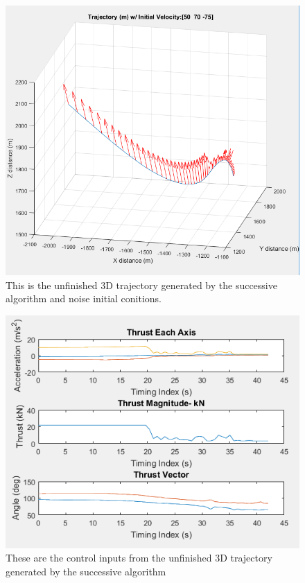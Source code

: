 \documentclass[journal]{new-aiaa}
\begin{document}
\begin{singlespace}
\begin{figure}[!htb] 
\centering
\includegraphics[width=.75\textwidth]{unfin.PNG}
\caption{This is the unfinished 3D trajectory generated by the successive algorithm and noise initial conitions.}
\label{fig:unfin}
\end{figure}

\begin{figure}[!htb] 
\centering
\includegraphics[width=.75\textwidth]{unfin2.PNG}
\caption{These are the control inputs from the unfinished 3D trajectory generated by the successive algorithm}
\label{fig:unfin2}
\end{figure}



\clearpage


\end{singlespace}
\end{document}

